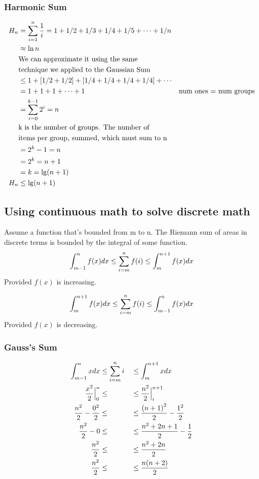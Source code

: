\documentclass[english, 10pt]{article}
\begin{document}
\subsubsection{Harmonic Sum}
\begin{align*}
    H_n &= \sum_{i=1}^{n} \frac{1}{i} = 1+1/2 +1/3 + 1/4 + 1/5 + \cdots + 1/n \\
    &\approx \ln n \\
    &\text{We can approximate it using the same} \\
    &\text{technique we applied to the Gaussian Sum}\\
    &\le 1 + [1/2 + 1/2] + [1/4 + 1/4 + 1/4 + 1/4] + \cdots \\
    &= 1 + 1 + 1 + \cdots + 1 &\text{num ones = num  groups} \\
    &= \sum_{i=0}^{k-1} 2^i =n \\
    &\text{k is the number of groups. The number of} \\
    &\text{items per group, summed, which must sum to n} \\
    &= 2^k -1 =n \\
    &= 2^k = n+1 \\
    &= k= \lg (n+1) \\
    H_n &\le \lg (n+1) \\
\end{align*}

\subsection{Using continuous math to solve discrete math}

Assume a function that's bounded from m to n. The Riemann sum of areas in discrete terms is bounded by the integral of some function.
$$\int_{m-1}^n f(x) dx \le \sum_{i=m}^{n} f(i) \le \int_{m}^{n+1} f(x) dx$$ Provided $f(x)$ is increasing.

$$\int_{m}^{n+1} f(x) dx \le \sum_{i=m}^{n} f(i) \le \int_{m-1}^{n} f(x) dx$$ Provided $f(x)$ is decreasing.

\subsubsection{Gauss's Sum}
\begin{alignat*}{3}
    \int_{m-1}^n x dx            &\le \sum_{i=m}^{n} i &&\le \int_{m}^{n+1} x dx \\
    \frac{x^2}{2} \Big|_0^n      &\le              &&\le \frac{n^2}{2} \Big|_i^{n+1} \\
    \frac{n^2}{2} -\frac{0^2}{2} &\le              &&\le \frac{{(n+1)}^2}{2} -\frac{1^2}{2} \\
    \frac{n^2}{2}-0              &\le              &&\le \frac{n^2+2n+1}{2} -\frac{1}{2} \\
    \frac{n^2}{2}                &\le              &&\le \frac{n^2+2n}{2}  \\
    \frac{n^2}{2}                &\le              &&\le \frac{n(n+2)}{2}
\end{alignat*}
\end{document}
